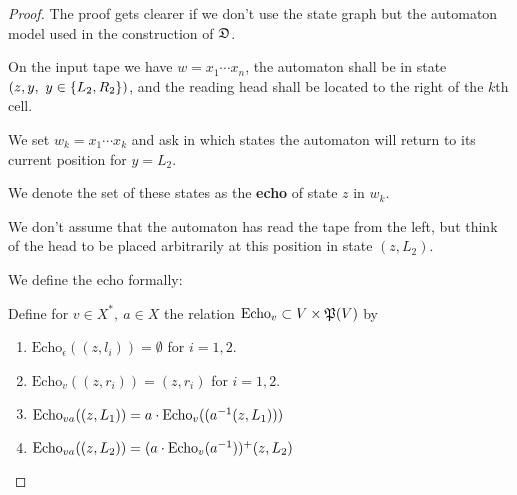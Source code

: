 \begin{proof}
The proof gets clearer if we don't use the state graph but the automaton model
used in the construction of $\mbox{$\mathfrak{D}$}$.

\missingfigure

On the input tape we have $w = x_1 \cdots x_n$, the automaton shall be in state
$(z, y	,\ y \in \mbox{$\{L_2, R_2\}$})$, and the reading head shall be located to the
right of the $k$th cell.

We set $w_k = x_1 \cdots x_k$ and ask in which states the automaton will return
to its current position for $y = L_2$.

We denote the set of these states as the {\bf echo} of state $z$ in $w_k$.

We don't assume that the automaton has read the tape from the left, but think of
the head to be placed arbitrarily at this position in state $(z, L_2)$.

We define the echo formally:
\newcommand{\echo}[2]{\mathrm{Echo}_{#1}(#2)}

Define for $v \in X^*,\ a \in X$ the relation $\mathrm{Echo}_v \subset V \times
\mathfrak{P}({V})$ by
\begin{enumerate}
  \item $\echo{\epsilon}{(z, l_i)} = \emptyset$ for $i = 1, 2$.
  
  \item $\echo{v}{(z, r_i)} = (z, r_i)$ for $i = 1, 2$.
  
  \item $\echo{va}{(z, L_1)} = a \cdot \echo{v}{(\inv{a}(z, L_1))}$
  
  \item $\echo{va}{(z, L_2)} = (a \cdot \echo{v}{\inv{a}})^+ (z, L_2)$
\end{enumerate}

\end{proof}






























